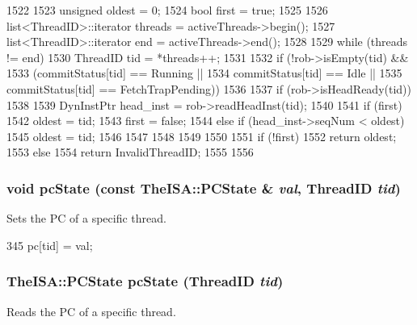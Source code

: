 \begin{DoxyCode}
1522 {
1523     unsigned oldest = 0;
1524     bool first = true;
1525 
1526     list<ThreadID>::iterator threads = activeThreads->begin();
1527     list<ThreadID>::iterator end = activeThreads->end();
1528 
1529     while (threads != end) {
1530         ThreadID tid = *threads++;
1531 
1532         if (!rob->isEmpty(tid) &&
1533             (commitStatus[tid] == Running ||
1534              commitStatus[tid] == Idle ||
1535              commitStatus[tid] == FetchTrapPending)) {
1536 
1537             if (rob->isHeadReady(tid)) {
1538 
1539                 DynInstPtr head_inst = rob->readHeadInst(tid);
1540 
1541                 if (first) {
1542                     oldest = tid;
1543                     first = false;
1544                 } else if (head_inst->seqNum < oldest) {
1545                     oldest = tid;
1546                 }
1547             }
1548         }
1549     }
1550 
1551     if (!first) {
1552         return oldest;
1553     } else {
1554         return InvalidThreadID;
1555     }
1556 }
\end{DoxyCode}
\hypertarget{classDefaultCommit_aaa8fbb79b13ce112b6d11f77bc3dd18f}{
\subsubsection[{pcState}]{\setlength{\rightskip}{0pt plus 5cm}void pcState (const TheISA::PCState \& {\em val}, \/  {\bf ThreadID} {\em tid})}}
\label{classDefaultCommit_aaa8fbb79b13ce112b6d11f77bc3dd18f}
Sets the PC of a specific thread. 


\begin{DoxyCode}
345     { pc[tid] = val; }
\end{DoxyCode}
\hypertarget{classDefaultCommit_af486ac7476906f63fc6696b3e76a411b}{
\subsubsection[{pcState}]{\setlength{\rightskip}{0pt plus 5cm}TheISA::PCState pcState ({\bf ThreadID} {\em tid})}}
\label{classDefaultCommit_af486ac7476906f63fc6696b3e76a411b}
Reads the PC of a specific thread. 


